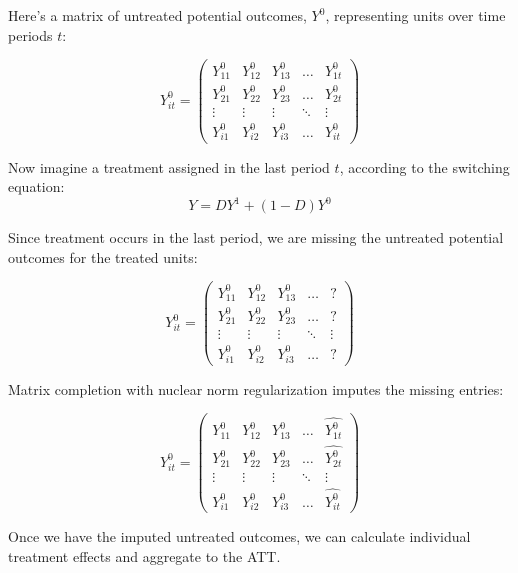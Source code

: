 \documentclass{beamer}
\begin{document}
\begin{frame}[plain]
\small
Here's a matrix of untreated potential outcomes, $Y^0$, representing units over time periods $t$:
\begin{center}
\[
Y^0_{it} = \begin{pmatrix}
Y^0_{11} & Y^0_{12} & Y^0_{13} & \dots & Y^0_{1t} \\
Y^0_{21} & Y^0_{22} & Y^0_{23} & \dots & Y^0_{2t} \\
\vdots & \vdots & \vdots & \ddots & \vdots \\
Y^0_{i1} & Y^0_{i2} & Y^0_{i3} & \dots & Y^0_{it}
\end{pmatrix}
\]
\end{center}

Now imagine a treatment assigned in the last period $t$, according to the switching equation:
\[
Y = DY^1 + (1-D)Y^0
\]
\end{frame}



\begin{frame}[plain]
\small
Since treatment occurs in the last period, we are missing the untreated potential outcomes for the treated units:

\begin{center}
\[
Y^0_{it} = \begin{pmatrix}
Y^0_{11} & Y^0_{12} & Y^0_{13} & \dots & ? \\
Y^0_{21} & Y^0_{22} & Y^0_{23} & \dots & ? \\
\vdots & \vdots & \vdots & \ddots & \vdots \\
Y^0_{i1} & Y^0_{i2} & Y^0_{i3} & \dots & ?
\end{pmatrix}
\]
\end{center}

\end{frame}




\begin{frame}[plain]
\small
Matrix completion with nuclear norm regularization imputes the missing entries:

\begin{center}
\[
Y^0_{it} = \begin{pmatrix}
Y^0_{11} & Y^0_{12} & Y^0_{13} & \dots & \widehat{Y^0_{1t}} \\
Y^0_{21} & Y^0_{22} & Y^0_{23} & \dots & \widehat{Y^0_{2t}} \\
\vdots & \vdots & \vdots & \ddots & \vdots \\
Y^0_{i1} & Y^0_{i2} & Y^0_{i3} & \dots & \widehat{Y^0_{it}}
\end{pmatrix}
\]
\end{center}

Once we have the imputed untreated outcomes, we can calculate individual treatment effects and aggregate to the ATT.
\end{frame}
\end{document}

